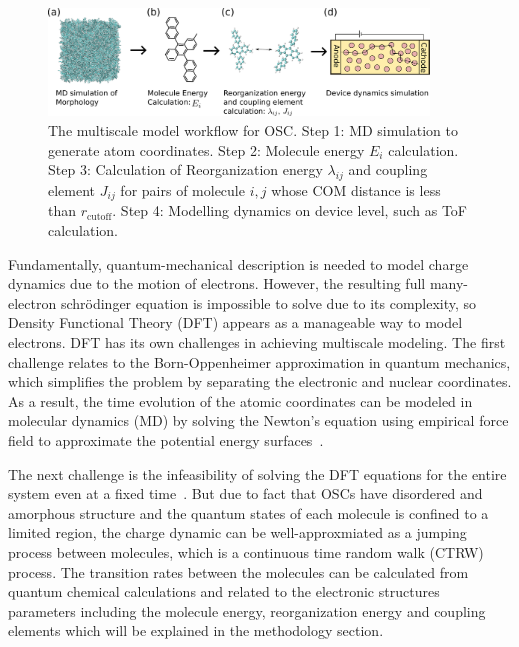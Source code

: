 \documentclass[%
 reprint,
superscriptaddress,
 amsmath,amssymb,
 aps,
prb,
floatfix
]{revtex4-2}
\begin{document}
\begin{figure}
  \centering
  \includegraphics[width=0.9\textwidth]{figs/MSM.pdf}
  \caption{The multiscale model workflow for OSC. Step 1: MD simulation to generate atom coordinates. Step 2: Molecule energy $E_i$ calculation. Step 3: Calculation of Reorganization energy $\lambda_{ij}$ and coupling element $J_{ij}$ for pairs of molecule $i,j$ whose COM distance is less than $r_\text{cutoff}$. Step 4: Modelling dynamics on device level, such as ToF calculation.}
  \label{fig:MSM}
\end{figure}

Fundamentally, quantum-mechanical description is needed to model charge dynamics due to the motion of electrons. However, the resulting full many-electron schr\"{o}dinger equation is impossible to solve due to its complexity, so Density Functional Theory (DFT) \cite{kohn_selfconsistent_1965,jones_density_2015, hammesschiffer_conundrum_2017} appears as a manageable way to model electrons.
DFT has its own challenges in achieving multiscale modeling.
The first challenge relates to the Born-Oppenheimer approximation \cite{born_zur_1927} in quantum
mechanics, which simplifies the problem by separating the electronic and nuclear
coordinates. As a result, the time evolution of the atomic coordinates can be modeled in molecular dynamics (MD) by solving the Newton's equation using empirical force field to approximate the potential energy surfaces~\cite{rapaport_art_2004}. 

The next challenge is the infeasibility of solving the DFT equations for the entire system even at a fixed time~\cite{hammesschiffer_conundrum_2017}. 
But due to fact that OSCs have disordered and amorphous structure and the quantum states of each molecule is confined to a limited region, the charge dynamic can be well-approxmiated as a jumping process between molecules, which is a continuous time random walk (CTRW) process.
The transition rates between the molecules can be calculated from quantum chemical calculations and related to the electronic structures parameters including the molecule energy, reorganization energy and coupling elements which will be explained in the methodology section. 
\end{document}
